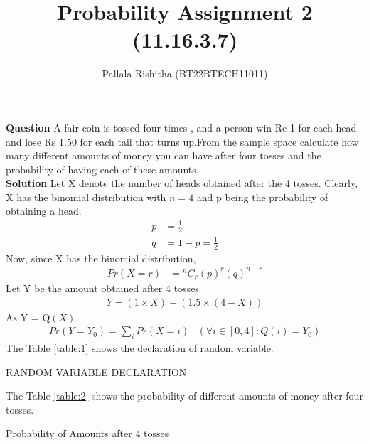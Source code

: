 \documentclass[12pt,onecolumn,notitlepage]{article}
\title{Probability Assignment 2 (11.16.3.7)}
\author{Pallala Rishitha (BT22BTECH11011)}
\date{}
\providecommand{\brak}[1]{\ensuremath{\left(#1\right)}}
\newcommand*{\comb}[2]{{}^{#1}C_{#2}}
\begin{document}
\maketitle
\textbf{Question}
A fair coin is tossed four times , and a person win Re 1 for each head and lose Rs 1.50 for each tail that turns up.From the sample space calculate how many different amounts of money you can have after four tosses and the
probability of having each of these amounts. \\
\textbf{Solution}
Let X denote the number of heads obtained after the 4 tosses. Clearly, X has the binomial distribution with $n=4$ and p being the probability of obtaining a head.
\begin{align}
    p &= \frac{1}{2} \\ 
    q &=1-p = \frac{1}{2}     
\end{align}
Now, since X has the binomial distribution,
\begin{align}
 Pr\brak{X=r} &= \comb{n}{r}\brak{p}^{r}\brak{q}^{n-r} 
\end{align}
Let Y be the amount obtained after 4 tosses
\begin{align}
    Y= (1\times X) - (1.5\times(4-X))
\end{align}
As Y = Q\brak{X},
\begin{align}
  Pr\brak{Y=Y_0} = \sum_i Pr\brak{X=i} &\brak{\forall i\in [0,4]:Q\brak{i}=Y_0} 
 \end{align}
 The Table \ref{table:1} shows the declaration of random variable.\\
 \setlength{\tabcolsep}{18pt}
 \renewcommand{\arraystretch}{2.15}
 \begin{table}
\centering
\caption{RANDOM VARIABLE DECLARATION}
\label{table:1}

\end{table}
The Table \ref{table:2} shows the probability of different amounts of money after four tosses.
 \setlength{\tabcolsep}{18pt}
 \renewcommand{\arraystretch}{2.15}
\begin{table}
\centering

\caption{Probability of Amounts after 4 tosses}
\label{table:2}

\end{table}
\end{document}
